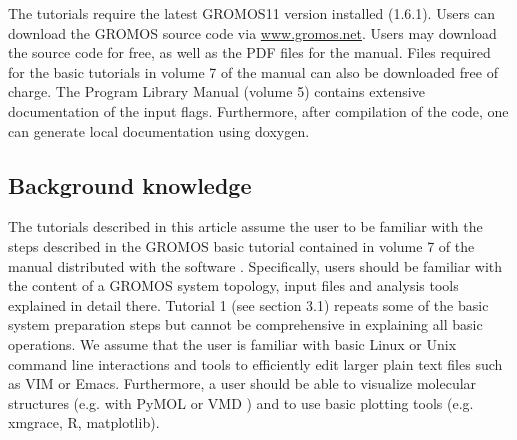 The tutorials require the latest GROMOS11 version installed (1.6.1). 
Users can download the GROMOS source code via \url{www.gromos.net}.  Users may download the source code for free, as well as the PDF files for the manual. Files required for the basic tutorials in volume 7 of the manual can also be downloaded free of charge.
The Program Library Manual (volume 5) \cite{volume_5} 
contains extensive documentation of the input flags. Furthermore, after compilation of the code, one can generate local documentation using doxygen.


\subsection{Background knowledge}
%
The tutorials described in this article assume the user to be familiar with the steps described in the GROMOS basic tutorial contained in volume 7 of the manual distributed with the software \cite{volume_7}. 
Specifically, users should be familiar with the content of a GROMOS system topology, input files and analysis tools explained in detail there.
Tutorial 1 (see section 3.1) repeats some of the basic system preparation steps but cannot be comprehensive in explaining all basic operations. We assume that the user is familiar with basic Linux or Unix 
command line interactions and tools to efficiently edit larger plain text files such as VIM or Emacs. Furthermore, a user should be able to visualize molecular structures (e.g. with PyMOL \cite{pymol} or VMD \cite{HUMP96}) 
and to use basic plotting tools (e.g. xmgrace, R, matplotlib).  

